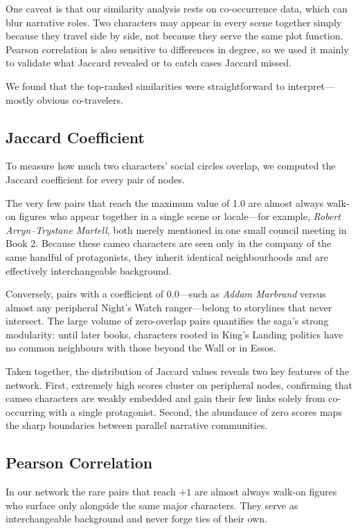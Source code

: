 \documentclass[12pt, a4paper]{article}
\begin{document}
One caveat is that our similarity analysis rests on co-occurrence data, which can blur narrative roles. Two characters may appear in every scene together simply because they travel side by side, not because they serve the same plot function. Pearson correlation is also sensitive to differences in degree, so we used it mainly to validate what Jaccard revealed or to catch cases Jaccard missed.

We found that the top-ranked similarities were straightforward to interpret—mostly obvious co-travelers.

\subsection*{Jaccard Coefficient}

To measure how much two characters’ social circles overlap, we computed the
Jaccard coefficient for every pair of nodes.

The very few pairs that reach the maximum value of 1.0 are almost always
walk-on figures who appear together in a single scene or locale—for example,
\textit{Robert Arryn–Trystane Martell}, both merely mentioned in one small
council meeting in Book 2.  Because these cameo characters are seen only in the
company of the same handful of protagonists, they inherit identical
neighbourhoods and are effectively interchangeable background.

Conversely, pairs with a coefficient of 0.0—such as \textit{Addam Marbrand}
versus almost any peripheral Night’s Watch ranger—belong to storylines that
never intersect.  The large volume of zero-overlap pairs quantifies the
saga’s strong modularity: until later books, characters rooted in King’s
Landing politics have no common neighbours with those beyond the Wall or in
Essos.

Taken together, the distribution of Jaccard values reveals two key features
of the network.  First, extremely high scores cluster on peripheral nodes,
confirming that cameo characters are weakly embedded and gain their few links
solely from co-occurring with a single protagonist.  Second, the abundance of
zero scores maps the sharp boundaries between parallel narrative communities.

\subsection*{Pearson Correlation}

In our network the rare pairs that reach \(+1\) are almost always
walk-on figures who surface only alongside the same major characters.  
They serve as interchangeable background and never forge ties of their own.
\end{document}
